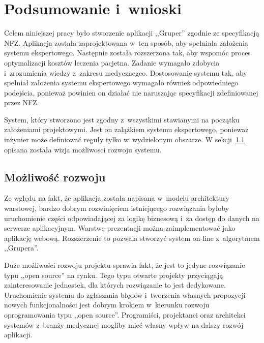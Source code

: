 \chapter{Podsumowanie i~wnioski}
\label{cha:podsumowanie}

Celem niniejszej pracy było stworzenie aplikacji ,,Gruper'' zgodnie ze specyfikacją NFZ. Aplikacja została zaprojektowana w~ten sposób, aby spełniała założenia systemu ekspertowego. Następnie została rozszerzona tak, aby wspomóc proces optymalizacji kosztów leczenia pacjetna. Zadanie wymagało zdobycia i~zrozumienia wiedzy z~zakresu medycznegeo. Dostosowanie systemu tak, aby spełniał założenia systemu ekspertowego wymagało również odpowiedniego podejścia, ponieważ powinien on działać nie naruszając specyfikacji zdefiniowanej przez NFZ.

System, który stworzono jest zgodny z~wszystkimi stawianymi na początku założeniami projektowymi. Jest on zalążkiem systemu ekspertowego, ponieważ inżynier może definiować reguły tylko w~wydzielonym obszarze. W sekcji~\ref{sec:mozliwoscRozwoju} opisana została wizja możliwosci rozwoju systemu.


\section{Możliwość rozwoju}
\label{sec:mozliwoscRozwoju}

Ze wględu na fakt, że aplikacja została napisana w~modelu architektury warstowej, bardzo dobrym rozwinięciem istniejącego rozwiązania byłoby uruchomienie części odpowiadającej za logikę biznesową i~za dostęp do danych na serwerze aplikacyjnym. Warstwę prezentacji można zaimplementować jako aplikację webową. Rozszerzenie to pozwala stworzyć system on-line z~algorytmem ,,Grupera''.

Duże możliwości rozwoju projektu sprawia fakt, że jest to jedyne rozwiązanie typu ,,open source'' na rynku. Tego typu otwarte projekty przyciągają zainteresowanie jednostek, dla których rozwiązanie to jest dedykowane. Uruchomienie systemu do zgłaszania błędów i~tworzenia własnych propozycji nowych funkcjonalności jest dobrym krokiem w~kierunku rozwoju oprogramowania typu ,,open source''. Programiści, projektanci oraz architekci systemów z~branży medycznej mogliby mieć własny wpływ na dalszy rozwój aplikacji.

